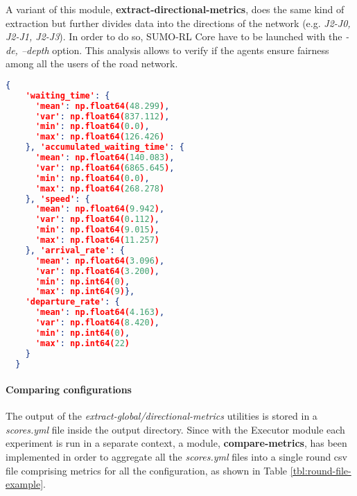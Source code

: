 A variant of this module, \textbf{extract-directional-metrics}, does the same kind of extraction but further divides data into the directions of the network (e.g. \textit{J2-J0, J2-J1, J2-J3}).
In order to do so, SUMO-RL Core have to be launched with the \textit{-de, --depth} option.
This analysis allows to verify if the agents ensure fairness among all the users of the road network.

\noindent
\begin{minipage}{\linewidth}
\begin{lstlisting}[language=JSON, caption=Example of dictionary of metrics extracted from the metric files, label={lst:metrics-global-extraction-example}]
  {
    'waiting_time': {
      'mean': np.float64(48.299),
      'var': np.float64(837.112),
      'min': np.float64(0.0),
      'max': np.float64(126.426)
    }, 'accumulated_waiting_time': {
      'mean': np.float64(140.083),
      'var': np.float64(6865.645),
      'min': np.float64(0.0),
      'max': np.float64(268.278)
    }, 'speed': {
      'mean': np.float64(9.942),
      'var': np.float64(0.112),
      'min': np.float64(9.015),
      'max': np.float64(11.257)
    }, 'arrival_rate': {
      'mean': np.float64(3.096),
      'var': np.float64(3.200),
      'min': np.int64(0),
      'max': np.int64(9)},
    'departure_rate': {
      'mean': np.float64(4.163),
      'var': np.float64(8.420),
      'min': np.int64(0),
      'max': np.int64(22)
    }
  }
\end{lstlisting}
\end{minipage}

\paragraph{Comparing configurations}

The output of the \textit{extract-global/directional-metrics} utilities is stored in a \textit{scores.yml} file inside the output directory.
Since with the Executor module each experiment is run in a separate context, a module, \textbf{compare-metrics}, has been implemented in order to aggregate all the \textit{scores.yml} files into a single round csv file comprising metrics for all the configuration, as shown in Table \ref{tbl:round-file-example}.

